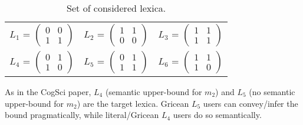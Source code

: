 \documentclass[a4paper]{article}
\begin{document}
\begin{table}[h]
\centering 
\begin{tabular}{l c l}
$L_1$ = $\begin{pmatrix} 0 & 0 \\ 1 & 1 \end{pmatrix}$ & 
$L_2$ = $\begin{pmatrix} 1 & 1 \\ 0 & 0 \end{pmatrix}$ & 
$L_3$ = $\begin{pmatrix} 1 & 1 \\ 1 & 1 \end{pmatrix}$\\[0.5cm]

$L_4$ = $\begin{pmatrix} 0 & 1 \\ 1 & 0 \end{pmatrix}$ &
$L_5$ = $\begin{pmatrix} 0 & 1 \\ 1 & 1 \end{pmatrix}$ &
$L_6$ = $\begin{pmatrix} 1 & 1 \\ 1 & 0 \end{pmatrix}$
\end{tabular}
\caption{{\footnotesize Set of considered lexica.}}
\label{tab:lexica}
\end{table}

As in the CogSci paper, $L_4$ (semantic upper-bound for $m_2$) and $L_5$ (no semantic upper-bound for $m_2$) are the target lexica. Gricean $L_5$ users can convey/infer the bound pragmatically, while literal/Gricean $L_4$ users do so semantically.
\end{document}
